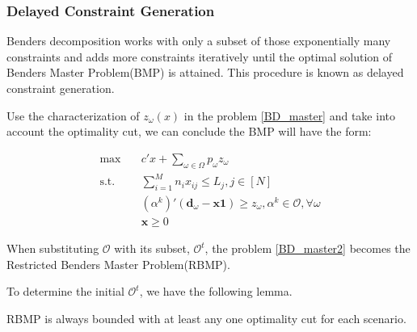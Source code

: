 \subsubsection{Delayed Constraint Generation}\label{bender_stage}
Benders decomposition works with only a subset of those exponentially many constraints and adds more constraints iteratively until the optimal solution of Benders Master Problem(BMP) is attained. This procedure is known as delayed constraint generation.

Use the characterization of $z_{\omega}(x)$ in the problem \eqref{BD_master} and take into account the optimality cut, we can conclude the BMP will have the form:

\begin{equation}\label{BD_master2}
  \begin{aligned}
    \max \quad & c{'} x + \sum_{\omega \in \Omega} p_{\omega} z_{\omega} \\
    \text {s.t.} \quad & \sum_{i=1}^{M} n_{i} x_{ij} \leq L_j, j \in [N] \\
    & (\alpha^{k}){'}(\mathbf{d}_{\omega}- \mathbf{x} \mathbf{1}) \geq z_{\omega}, \alpha^k \in \mathcal{O}, \forall \omega \\
     & \mathbf{x} \geq 0
  \end{aligned}
\end{equation}

When substituting $\mathcal{O}$ with its subset, $\mathcal{O}^{t}$, the problem \eqref{BD_master2} becomes the Restricted Benders Master Problem(RBMP). 


To determine the initial $\mathcal{O}^{t}$, we have the following lemma.

\begin{lem}\label{one_ep_feasible}
RBMP is always bounded with at least any one optimality cut for each scenario.
\end{lem}

